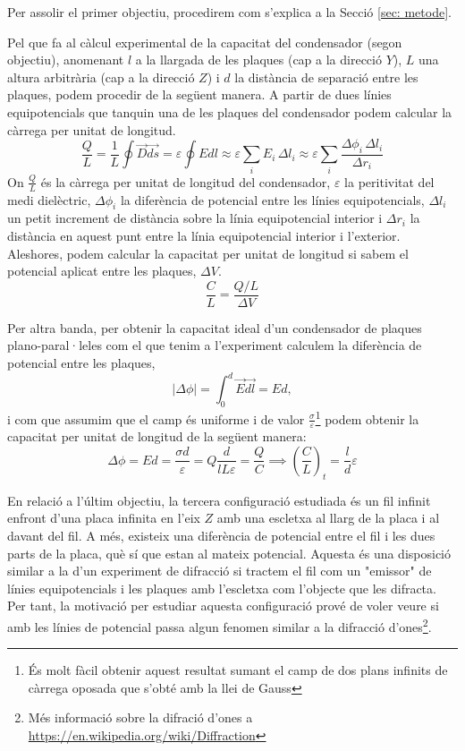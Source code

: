 \documentclass[11pt]{article}
\numberwithin{equation}{section}
\numberwithin{figure}{section}
\numberwithin{table}{section}
\begin{document}
Per assolir el primer objectiu, procedirem com s'explica a la Secció \ref{sec: metode}.

Pel que fa al càlcul experimental de la capacitat del condensador (segon objectiu), anomenant $l$ a la llargada de les plaques (cap a la direcció $Y$), $L$ una altura arbitrària (cap a la direcció $Z$) i $d$ la distància de separació entre les plaques, podem procedir de la següent manera.
A partir de dues línies equipotencials que tanquin una de les plaques del condensador podem calcular la càrrega per unitat de longitud.
\begin{equation}
    \frac{Q}{L} = \frac{1}{L}\oint\vec{D}\vec{ds}=\varepsilon\oint Edl\approx \varepsilon \sum_i E_i \, \Delta l_i \approx \varepsilon \sum_i \frac{\Delta \phi_i \, \Delta l_i}{\Delta r_i}
    \label{eq: Q}
\end{equation}
On $\frac{Q }{L }$ és la càrrega per unitat de longitud del condensador, $\varepsilon$ la peritivitat del medi dielèctric, $\Delta \phi_i$ la diferència de potencial entre les línies equipotencials, $\Delta l_i$ un petit increment de distància sobre la línia equipotencial interior i $\Delta r_i$ la distància en aquest punt entre la línia equipotencial interior i l'exterior.
Aleshores, podem calcular la capacitat per unitat de longitud si sabem el potencial aplicat entre les plaques, $\Delta V$.
\begin{equation}
    \frac{C}{L}=\frac{Q/L}{\Delta V}
    \label{eq: C}
\end{equation}

Per altra banda, per obtenir la capacitat ideal d'un condensador de plaques plano-paral·leles com el que tenim a l'experiment calculem la diferència de potencial entre les plaques,
\begin{equation}
    |\Delta\phi|=\int_{0}^{d} \vec{E}\vec{dl}= Ed,
\end{equation}
i com que assumim que el camp és uniforme i de valor $\frac{\sigma}{\varepsilon}$\footnote{És molt fàcil obtenir aquest resultat sumant el camp de dos plans infinits de càrrega oposada que s'obté amb la llei de Gauss} podem obtenir la capacitat per unitat de longitud de la següent manera:
\begin{equation}
    \Delta\phi=Ed=\frac{\sigma d}{\varepsilon}
    =Q\frac{d}{lL\varepsilon}=\frac{Q}{C}\implies (\frac{C}{L})_t=\frac{l}{d}\varepsilon
    \label{eq: c_t}
\end{equation}

En relació a l'últim objectiu, la tercera configuració estudiada és un fil infinit enfront d'una placa infinita en l'eix $Z$ amb una escletxa al llarg de la placa i al davant del fil. A més, existeix una diferència de potencial entre el fil i les dues parts de la placa, què sí que estan al mateix potencial. Aquesta és una disposició similar a la d'un experiment de difracció si tractem el fil com un "emissor" de línies equipotencials i les plaques amb l'escletxa com l'objecte que les difracta. Per tant, la motivació per estudiar aquesta configuració prové de voler veure si amb les línies de potencial passa algun fenomen similar a la difracció d'ones\footnote{Més informació sobre la difració d'ones a \url{https://en.wikipedia.org/wiki/Diffraction}}.
\end{document}
